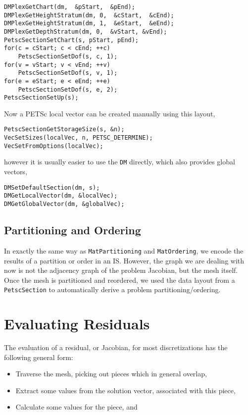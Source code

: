 {\begin{lstlisting}
DMPlexGetChart(dm,  &pStart,  &pEnd);
DMPlexGetHeightStratum(dm, 0,  &cStart,  &cEnd);
DMPlexGetHeightStratum(dm, 1,  &eStart,  &eEnd);
DMPlexGetDepthStratum(dm, 0,  &vStart, &vEnd);
PetscSectionSetChart(s, pStart, pEnd);
for(c = cStart; c < cEnd; ++c)
    PetscSectionSetDof(s, c, 1);
for(v = vStart; v < vEnd; ++v)
    PetscSectionSetDof(s, v, 1);
for(e = eStart; e < eEnd; ++e)
    PetscSectionSetDof(s, e, 2);
PetscSectionSetUp(s);
\end{lstlisting}
Now a PETSc local vector can be created manually using this layout,
\begin{lstlisting}
PetscSectionGetStorageSize(s, &n);
VecSetSizes(localVec, n, PETSC_DETERMINE);
VecSetFromOptions(localVec);
\end{lstlisting}
however it is usually easier to use the \lstinline{DM} directly, which also provides global vectors,
\begin{lstlisting}
DMSetDefaultSection(dm, s);
DMGetLocalVector(dm, &localVec);
DMGetGlobalVector(dm, &globalVec);
\end{lstlisting}

\subsection{Partitioning and Ordering}

In exactly the same way as \lstinline{MatPartitioning} and \lstinline{MatOrdering}, we encode the results of a partition or order in an
IS. However, the graph we are dealing with now is not the adjacency graph of the problem Jacobian, but the mesh
itself. Once the mesh is partitioned and reordered, we used the data layout from a \lstinline{PetscSection} to automatically derive
a problem partitioning/ordering.

\section{Evaluating Residuals} 

The evaluation of a residual, or Jacobian, for most discretizations has the following general form:
\begin{itemize}
  \item Traverse the mesh, picking out pieces which in general overlap,

  \item Extract some values from the solution vector, associated with this piece,

  \item Calculate some values for the piece, and


\end{itemize}}
